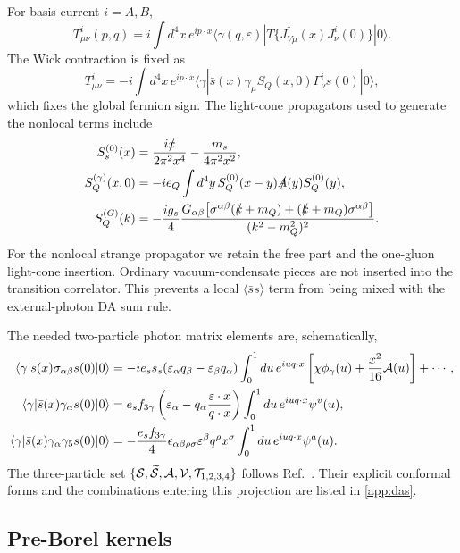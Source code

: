 \documentclass[11pt,a4paper]{article}
\begin{document}
For basis current $i=A,B$,
\begin{equation}
T^i_{\mu\nu}(p,q)=i\int d^4x\,e^{ip\cdot x}
\langle\gamma(q,\varepsilon)|T\{J^\dagger_{V\mu}(x)J^i_\nu(0)\}|0\rangle .
\end{equation}
The Wick contraction is fixed as
\begin{equation}
T^i_{\mu\nu}=-i\int d^4x\,e^{ip\cdot x}
\langle\gamma|\bar s(x)\gamma_\mu S_Q(x,0)
\Gamma^i_\nu s(0)|0\rangle,
\end{equation}
which fixes the global fermion sign.  The light-cone propagators used to
generate the nonlocal terms include
\begin{align}
S_s^{(0)}(x)&={i\slashed x\over2\pi^2x^4}
-{m_s\over4\pi^2x^2},\\
S_Q^{(\gamma)}(x,0)&=-ie_Q\int d^4y\,
S_Q^{(0)}(x-y)\slashed A(y)S_Q^{(0)}(y),\\
S_Q^{(G)}(k)&=-{ig_s\over4}{G_{\alpha\beta}\bigl[
\sigma^{\alpha\beta}(\slashed k+m_Q)
+(\slashed k+m_Q)\sigma^{\alpha\beta}\bigr]\over(k^2-m_Q^2)^2}.
\end{align}
For the nonlocal strange propagator we retain the free part and the
one-gluon light-cone insertion.  Ordinary vacuum-condensate pieces are not
inserted into the transition correlator.  This prevents a local
$\langle\bar ss\rangle$ term from being mixed with the external-photon DA
sum rule.

The needed two-particle photon matrix elements are, schematically,
\begin{align}
\langle\gamma|\bar s(x)\sigma_{\alpha\beta}s(0)|0\rangle
&=-ie_s s_s(\varepsilon_\alpha q_\beta-\varepsilon_\beta q_\alpha)
\int_0^1du\,e^{iuq\cdot x}
\left[\chi\phi_\gamma(u)+{x^2\over16}{\cal A}(u)\right]+\cdots,\\
\langle\gamma|\bar s(x)\gamma_\alpha s(0)|0\rangle
&=e_s f_{3\gamma}\left(\varepsilon_\alpha
-q_\alpha{\varepsilon\cdot x\over q\cdot x}\right)
\int_0^1du\,e^{iuq\cdot x}\psi^v(u),\\
\langle\gamma|\bar s(x)\gamma_\alpha\gamma_5s(0)|0\rangle
&=-{e_s f_{3\gamma}\over4}\epsilon_{\alpha\beta\rho\sigma}
\varepsilon^\beta q^\rho x^\sigma
\int_0^1du\,e^{iuq\cdot x}\psi^a(u).
\end{align}
The three-particle set
$\{{\cal S},\widetilde{\cal S},{\cal A},{\cal V},
{\cal T}_{1,2,3,4}\}$ follows Ref.~\cite{BBK2003}.  Their explicit conformal
forms and the combinations entering this projection are listed in
\cref{app:das}.

\subsection{Pre-Borel kernels}
\end{document}
